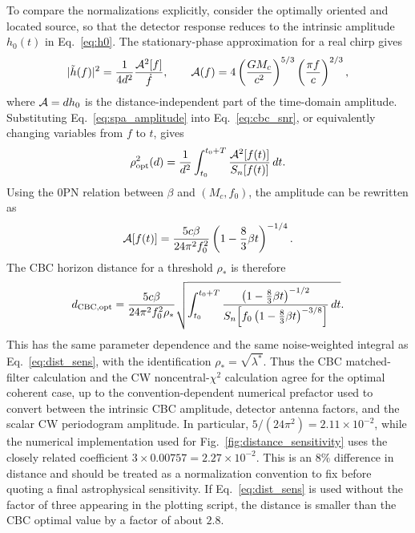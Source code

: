 \documentclass[aps,prd,amsmath,floats,floatfix, twocolumn,
superscriptaddress,nofootinbib,showpacs]{revtex4-2}
\begin{document}
To compare the normalizations explicitly, consider the optimally oriented and
located source, so that the detector response reduces to the intrinsic
amplitude $h_0(t)$ in Eq.~\eqref{eq:h0}.  The stationary-phase approximation
for a real chirp gives
\begin{equation}
    |\tilde h(f)|^2
    =
    \frac{1}{4d^2}
    \frac{{\cal A}^2[f]}{\dot f} ,
    \qquad
    {\cal A}(f)
    =
    4\left(\frac{G M_c}{c^2}\right)^{5/3}
    \left(\frac{\pi f}{c}\right)^{2/3} ,
    \label{eq:spa_amplitude}
\end{equation}
where ${\cal A}=d h_0$ is the distance-independent part of the time-domain
amplitude.  Substituting Eq.~\eqref{eq:spa_amplitude} into
Eq.~\eqref{eq:cbc_snr}, or equivalently changing variables from $f$ to $t$,
gives
\begin{equation}
    \rho^2_{\rm opt}(d)
    =
    \frac{1}{d^2}
    \int_{t_0}^{t_0+T}
    \frac{{\cal A}^2[f(t)]}
         {S_n[f(t)]}\,dt .
    \label{eq:cbc_time_domain_snr}
\end{equation}
Using the 0PN relation between $\beta$ and $(M_c,f_0)$, the amplitude can be
rewritten as
\begin{equation}
    {\cal A}[f(t)]
    =
    \frac{5c\beta}{24\pi^2 f_0^2}
    \left(1-\frac{8}{3}\beta t\right)^{-1/4}.
    \label{eq:amplitude_beta_form}
\end{equation}
The CBC horizon distance for a threshold $\rho_\ast$ is therefore
\begin{equation}
    d_{\rm CBC,opt}
    =
    \frac{5c\beta}{24\pi^2 f_0^2\rho_\ast}
    \sqrt{
    \int_{t_0}^{t_0+T}
    \frac{
    \left(1-\frac{8}{3}\beta t\right)^{-1/2}}
    {S_n\!\left[
    f_0\left(1-\frac{8}{3}\beta t\right)^{-3/8}
    \right]}
    \,dt
    } .
    \label{eq:cbc_distance_sensitivity}
\end{equation}
This has the same parameter dependence and the same noise-weighted integral as
Eq.~\eqref{eq:dist_sens}, with the identification
$\rho_\ast=\sqrt{\lambda^\ast}$.  Thus the CBC matched-filter calculation and
the CW noncentral-$\chi^2$ calculation agree for the optimal coherent case,
up to the convention-dependent numerical prefactor used to convert between the
intrinsic CBC amplitude, detector antenna factors, and the scalar CW
periodogram amplitude.  In particular,
$5/(24\pi^2)=2.11\times10^{-2}$, while the numerical implementation used for
Fig.~\ref{fig:distance_sensitivity} uses the closely related coefficient
$3\times0.00757=2.27\times10^{-2}$.  This is an $8\%$ difference in distance
and should be treated as a normalization convention to fix before quoting a
final astrophysical sensitivity.  If Eq.~\eqref{eq:dist_sens} is used without
the factor of three appearing in the plotting script, the distance is smaller
than the CBC optimal value by a factor of about $2.8$.
\end{document}
